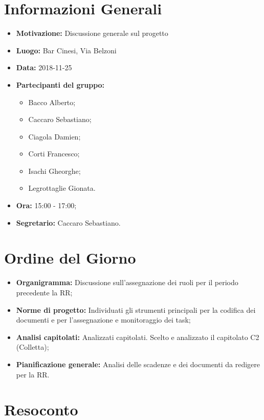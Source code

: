 \documentclass[a4paper, oneside, openany, dvipsnames, table]{article}
\begin{document}
\copertina{}


\newpage
\tableofcontents
\newpage

\section{Informazioni Generali}
\begin{itemize}
\item \textbf{Motivazione:} Discussione generale sul progetto
\item \textbf{Luogo:} Bar Cinesi, Via Belzoni
\item \textbf{Data:} 2018-11-25
\item \textbf{Partecipanti del gruppo:}
	\begin{itemize}
	\item Bacco Alberto;
	\item Caccaro Sebastiano;
	\item Ciagola Damien;
	\item Corti Francesco;
	\item Isachi Gheorghe;
	\item Legrottaglie Gionata.
	\end{itemize} 
\item \textbf{Ora:} 15:00 - 17:00;
\item \textbf{Segretario:} Caccaro Sebastiano.
\end{itemize}

\section{Ordine del Giorno}
\begin{itemize}
\item \textbf{Organigramma:} Discussione sull'assegnazione dei ruoli per il periodo precedente la RR;
\item \textbf{Norme di progetto:} Individuati gli strumenti principali per la codifica dei documenti e per l'assegnazione e monitoraggio dei task;
\item \textbf{Analisi capitolati:} Analizzati capitolati. Scelto e analizzato il capitolato C2 (Colletta);
\item \textbf{Pianificazione generale:} Analisi delle scadenze e dei documenti da redigere per la RR.
\end{itemize}

\section{Resoconto}
\end{document}
